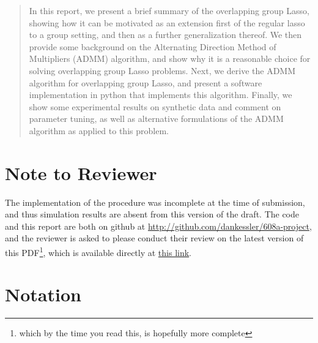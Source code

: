 \documentclass{article}
\begin{document}
\maketitle

\begin{abstract}
  In this report, we present a brief summary of the overlapping group Lasso, showing how it can be motivated as an extension first of the regular lasso to a group setting, and then as a further generalization thereof.
  We then provide some background on the Alternating Direction Method of Multipliers (ADMM) algorithm, and show why it is a reasonable choice for solving overlapping group Lasso problems.
  Next, we derive the ADMM algorithm for overlapping group Lasso, and present a software implementation in python that implements this algorithm.
  Finally, we show some experimental results on synthetic data and comment on parameter tuning, as well as alternative formulations of the ADMM algorithm as applied to this problem.
\end{abstract}

\section{Note to Reviewer}
\label{sec:note-reviewer}

The implementation of the procedure was incomplete at the time of submission, and thus simulation results are absent from this version of the draft.
The code and this report are both on github at \url{http://github.com/dankessler/608a-project}, and the reviewer is asked to please conduct their review on the latest version of this PDF\footnote{which by the time you read this, is hopefully more complete}, which is available directly at \href{https://github.com/dankessler/608a-project/blob/master/report/kesslerd-stats608a-project-report.pdf}{this link}.

\section{Notation}
\label{sec:notation}
\end{document}
